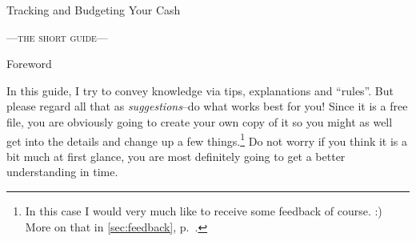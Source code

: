 \begin{center}\Large\sffamily
Tracking and Budgeting Your Cash
\end{center}
\begin{center}\scshape\large
	---the short guide---
\end{center}

\vspace{1cm}
\begin{center}
	Foreword\\
	\begin{minipage}[t]{0.8\columnwidth}\small
		In this guide, I try to convey knowledge via tips, explanations and ``rules''.
		But please regard all that as \emph{suggestions}--do what works best for you!
		Since it is a free file, you are obviously going to create your own copy of it so you might as well get into the details and change up a few things.\footnote{In this case I would very much like to receive some feedback of course. :) More on that in \autoref{sec:feedback}, p.~\pageref{sec:feedback}.}
		Do not worry if you think it is a bit much at first glance, you are most definitely going to get a better understanding in time.
	\end{minipage}
\end{center}
\vspace{1cm}

\tableofcontents

